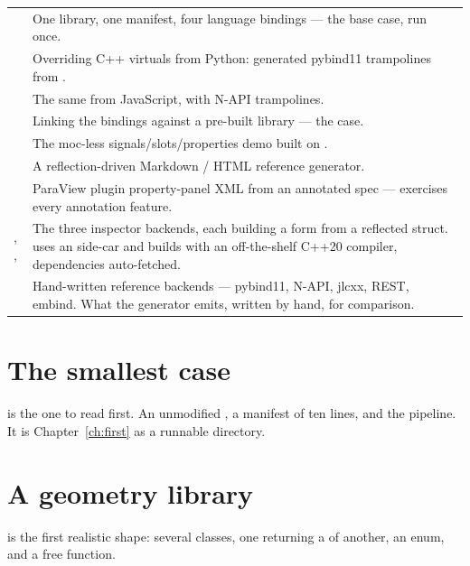 \begin{center}
\begin{longtable}{@{}L{5.1cm}L{8.5cm}@{}}
 &
  One library, one manifest, four language bindings --- the base case, run
  once. \\
\addlinespace
{} &
  Overriding C++ virtuals from Python: generated pybind11 trampolines from
  . \\
\addlinespace
{} &
  The same from JavaScript, with N-API trampolines. \\
\addlinespace
{} &
  Linking the bindings against a pre-built library --- the 
  case. \\
\addlinespace
{} &
  The moc-less signals/slots/properties demo built on . \\
\addlinespace
{} &
  A reflection-driven Markdown / HTML reference generator. \\
\addlinespace
{} &
  ParaView plugin property-panel XML from an annotated 
  spec --- exercises every annotation feature. \\
\addlinespace
{}, ,  &
  The three inspector backends, each building a form from a reflected struct.
   uses an  side-car and builds with an
  off-the-shelf C++20 compiler, dependencies auto-fetched. \\
\addlinespace
{} &
  Hand-written reference backends --- pybind11, N-API, jlcxx, REST, embind.
  What the generator emits, written by hand, for comparison. \\
\bottomrule
\end{longtable}
\end{center}

\section{The smallest case}

 is the one to read first. An unmodified
, a manifest of ten lines, and the pipeline. It is
Chapter~\ref{ch:first} as a runnable directory.

\section{A geometry library}

 is the first realistic shape: several classes, one
returning a  of another, an enum, and a free function.

